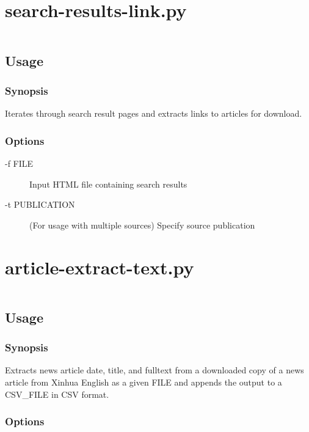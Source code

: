 \pagebreak
\appendix

\chapter{search-results-link.py}

\inputminted[linenos]{python}{../search-results-link.py}

\section{Usage}

\subsection{Synopsis}

Iterates through search result pages and extracts links to articles for
download.

\subsection{Options}

\begin{description}
	\item [-f FILE] Input HTML file containing search results
	\item [-t PUBLICATION] (For usage with multiple sources)
	Specify source publication
\end{description}

\chapter{article-extract-text.py}\label{adx:python-script}

\inputminted[linenos]{python}{../article-extract-text.py}

\section{Usage}

\subsection{Synopsis}

Extracts news article date, title, and fulltext from a downloaded copy
of a news article from Xinhua English as a given FILE and appends the
output to a CSV\_FILE in CSV format.

\subsection{Options}

